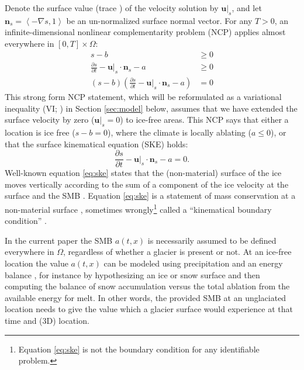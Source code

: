 \documentclass[hidelinks,onefignum,onetabnum,final]{siamart220329}  %
\newcommand{\grad}{\nabla}
\newcommand{\bn}{\mathbf{n}}
\newcommand{\bu}{\mathbf{u}}
\begin{document}
Denote the surface value (trace \cite{Evans2010}) of the velocity solution by $\bu|_s$, and let $\bn_s = \left<-\grad s,1\right>$ be an un-normalized surface normal vector.  For any $T>0$, an infinite-dimensional nonlinear complementarity problem (NCP) \cite{Bueler2021conservation,FacchineiPang2003,SchoofHewitt2013} applies almost everywhere in $[0,T]\times \Omega$:
\begin{subequations}
\label{eq:ncp}
\begin{align}
s - b &\ge 0 \\
\frac{\partial s}{\partial t} - \bu|_s \cdot \bn_s - a &\ge 0 \\
(s - b) \left(\frac{\partial s}{\partial t} - \bu|_s \cdot \bn_s - a\right) &= 0
\end{align}
\end{subequations}
This strong form NCP statement, which will be reformulated as a variational inequality (VI; \cite{KinderlehrerStampacchia1980}) in Section \ref{sec:model} below, assumes that we have extended the surface velocity by zero ($\bu|_s=0$) to ice-free areas.  This NCP says that either a location is ice free ($s-b=0$), where the climate is locally ablating ($a\le 0$), or that the surface kinematical equation (SKE) holds:
\begin{equation}
\frac{\partial s}{\partial t} - \bu|_s \cdot \bn_s - a = 0.  \label{eq:ske}
\end{equation}
Well-known equation \eqref{eq:ske} states that the (non-material) surface of the ice moves vertically according to the sum of a component of the ice velocity at the surface and the SMB \cite{SchoofHewitt2013}.  Equation \eqref{eq:ske} is a statement of mass conservation at a non-material surface \cite{Aschwandenetal2012}, sometimes wrongly\footnote{Equation \eqref{eq:ske} is not the boundary condition for any identifiable problem.} called a ``kinematical boundary condition'' \cite{GreveBlatter2009}.

In the current paper the SMB $a(t,x)$ is necessarily assumed to be defined everywhere in $\Omega$, regardless of whether a glacier is present or not.  At an ice-free location the value $a(t,x)$ can be modeled using precipitation and an energy balance \cite{GreveBlatter2009}, for instance by hypothesizing an ice or snow surface and then computing the balance of snow accumulation versus the total ablation from the available energy for melt.  In other words, the provided SMB at an unglaciated location needs to give the value which a glacier surface would experience at that time and (3D) location.
\end{document}
